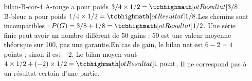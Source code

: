 \begin{blocEdition}{bilan-B-cor-4}
A-rouge a pour poids $3/4\times1/2=\res{3/8}$. B-bleue a pour poids $1/4\times1/2=\res{1/8}$.Les chemins sont incompatibles : $P(G)=3/8+1/8=\res{1/2}$. Une série finie peut avoir un nombre différent de 50 gains ; 50 est une valeur moyenne théorique sur 100, pas une garantie.En cas de gain, le bilan net est $6-2=4$ points ; sinon il est $-2$. Le bilan moyen vaut $4\times1/2+(-2)\times1/2=\res{1\text{ point}}$. Il ne correspond pas à un résultat certain d’une partie.\label{fig-bilan-B-cor-4}

\end{blocEdition}

